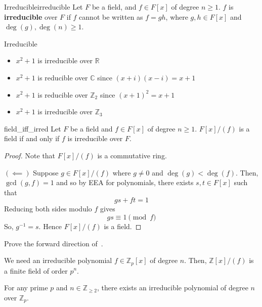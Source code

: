 
\begin{Definition}{Irreducible}{irreducible}
    Let $ F $ be a field, and $ f\in F[x] $ of degree $ n\geqslant 1 $.
    $ f $ is \textbf{irreducible} over $ F $ if $ f $ cannot be written
    as $ f=gh $, where $ g,h\in F[x] $ and $ \deg(g),\deg(n)\geqslant 1 $.
\end{Definition}

\begin{Example}{Irreducible}{}
    \begin{itemize}
        \item $ x^2+1 $ is irreducible over $ \mathbb{R} $
        \item $ x^2+1 $ is reducible over $ \mathbb{C} $ since $ (x+i)(x-i)=x+1 $
        \item $ x^2+1 $ is reducible over $ \mathbb{Z}_2 $ since $ (x+1)^2=x+1 $
        \item $ x^2+1 $ is irreducible over $ \mathbb{Z}_3 $
    \end{itemize}
\end{Example}

\begin{Theorem}{}{field_iff_irred}
    Let $ F $ be a field and $ f\in F[x] $ of degree $ n\geqslant 1 $.
    $ F[x]/(f) $ is a field if and only if $ f $ is irreducible over $ F $.
\end{Theorem}

\begin{proof}
    Note that $ F[x]/(f) $ is a commutative ring.

    $ (\impliedby) $ Suppose $ g\in F[x]/(f) $ where $ g\neq 0 $
    and $ \deg(g)<\deg(f) $. Then, $ \gcd(g,f)=1 $ and so by EEA
    for polynomials, there exists $ s,t\in F[x] $ such that
    \[ gs+ft=1 \]
    Reducing both sides modulo $ f $ gives
    \[ gs\equiv 1 \pmod{f} \]
    So, $ g^{-1}=s $. Hence $ F[x]/(f) $ is a field.
\end{proof}

\begin{Exercise}{}{}
    Prove the forward direction of~.
\end{Exercise}

We need an irreducible polynomial $ f\in\mathbb{Z}_p[x] $ of degree $ n $.
Then, $ \mathbb{Z}[x]/(f) $ is a finite field of order $ p^n $.

\begin{Theorem}{}{}
    For any prime $ p $ and $ n\in\mathbb{Z}_{\geqslant 2} $, there exists
    an irreducible polynomial of degree $ n $ over $ \mathbb{Z}_p $.
\end{Theorem}

